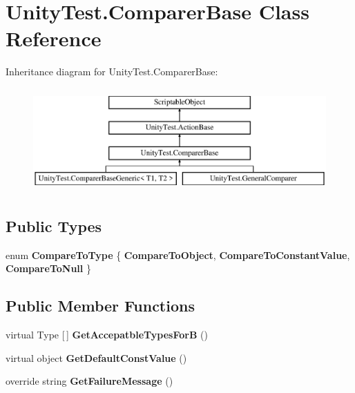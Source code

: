 \hypertarget{class_unity_test_1_1_comparer_base}{}\section{Unity\+Test.\+Comparer\+Base Class Reference}
\label{class_unity_test_1_1_comparer_base}
Inheritance diagram for Unity\+Test.\+Comparer\+Base\+:\begin{figure}[H]
\begin{center}
\leavevmode
\includegraphics[height=4.000000cm]{class_unity_test_1_1_comparer_base}
\end{center}
\end{figure}
\subsection*{Public Types}
\begin{DoxyCompactItemize}
\item 
\mbox{\label{class_unity_test_1_1_comparer_base_aea68fbc096f5b7c0fa2aa3ce685fe92e}} 
enum {\bfseries Compare\+To\+Type} \{ {\bfseries Compare\+To\+Object}, 
{\bfseries Compare\+To\+Constant\+Value}, 
{\bfseries Compare\+To\+Null}
 \}
\end{DoxyCompactItemize}
\subsection*{Public Member Functions}
\begin{DoxyCompactItemize}
\item 
\mbox{\label{class_unity_test_1_1_comparer_base_a5a4fc239d59fca63aa8a5cccb9a61114}} 
virtual Type \mbox{[}$\,$\mbox{]} {\bfseries Get\+Accepatble\+Types\+ForB} ()
\item 
\mbox{\label{class_unity_test_1_1_comparer_base_a034f1ab0c199d49897c66fd5efa2b52f}} 
virtual object {\bfseries Get\+Default\+Const\+Value} ()
\item 
\mbox{\label{class_unity_test_1_1_comparer_base_a52d578d37870a7dc8bf23f1a171bd7d7}} 
override string {\bfseries Get\+Failure\+Message} ()
\end{DoxyCompactItemize}
